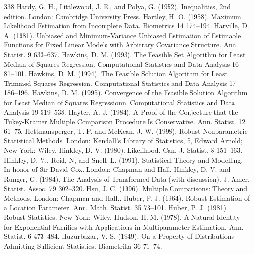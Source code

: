 \begin{thebibliography}{338}
\label{bib:source158} Hardy, G. H., Littlewood, J. E., and Polya, G. (1952). Inequalities, 2nd edition. London: Cambridge University Press.
\label{bib:source159} Hartley, H. O. (1958). Maximum Likelihood Estimation from Incomplete Data. Biometrics 14 174–194.
\label{bib:source160} Harville, D. A. (1981). Unbiased and Minimum-Variance Unbiased Estimation of Estimable Functions for Fixed Linear Models with Arbitrary Covariance Structure. Ann. Statist. 9 633–637.
\label{bib:source161} Hawkins, D. M. (1993). The Feasible Set Algorithm for Least Median of Squares Regression. Computational Statistics and Data Analysis 16 81–101.
\label{bib:source162} Hawkins, D. M. (1994). The Feasible Solution Algorithm for Least Trimmed Squares Regression. Computational Statistics and Data Analysis 17 186–196.
\label{bib:source163} Hawkins, D. M. (1995). Convergence of the Feasible Solution Algorithm for Least Median of Squares Regressionn. Computational Statistics and Data Analysis 19 519–538.
\label{bib:source164} Hayter, A. J. (1984). A Proof of the Conjecture that the Tukey-Kramer Multiple Comparison Procedure Is Conservative. Ann. Statist. 12 61–75.
\label{bib:source165} Hettmansperger, T. P. and McKean, J. W. (1998). Robust Nonparametric Statistical Methods. London: Kendall’s Library of Statistics, 5, Edward Arnold; New York: Wiley.
\label{bib:source166} Hinkley, D. V. (1980). Likelihood. Can. J. Statist. 8 151–163.
\label{bib:source167} Hinkley, D. V., Reid, N, and Snell, L. (1991). Statistical Theory and Modelling. In honor of Sir David Cox. London: Chapman and Hall.
\label{bib:source168} Hinkley, D. V. and Runger, G. (1984). The Analysis of Transformed Data (with discussion). J. Amer. Statist. Assoc. 79 302–320.
\label{bib:source169} Hsu, J. C. (1996). Multiple Comparisons: Theory and Methods. London: Chapman and Hall..
\label{bib:source170} Huber, P. J. (1964). Robust Estimation of a Location Parameter. Ann. Math. Statist. 35 73–101.
\label{bib:source171} Huber, P. J. (1981). Robust Statistics. New York: Wiley.
\label{bib:source172} Hudson, H. M. (1978). A Natural Identity for Exponential Families with Applications in Multiparameter Estimation. Ann. Statist. 6 473–484.
\label{bib:source173} Huzurbazar, V. S. (1949). On a Property of Distributions Admitting Sufficient Statistics. Biometrika 36 71–74.

\end{thebibliography}
